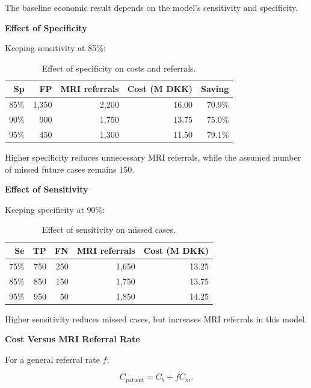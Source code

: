 \documentclass[11pt,a4paper]{article}
\newcommand{\subheading}[1]{%
    \vspace{3mm}
    {\large\bfseries\color{DTUblue}#1}\par
}
\begin{document}
The baseline economic result depends on
the model's sensitivity and specificity.

\subheading{Effect of Specificity}

Keeping sensitivity at 85\%:

\begin{table}[H]
\centering
\caption{Effect of specificity on costs and referrals.}
\begin{tabular}{@{}rrrrr@{}}
\toprule
\textbf{Sp} &
\textbf{FP} &
\textbf{MRI referrals} &
\textbf{Cost (M DKK)} &
\textbf{Saving} \\
\midrule
85\% & 1,350 & 2,200 & 16.00 & 70.9\% \\
90\% & 900 & 1,750 & 13.75 & 75.0\% \\
95\% & 450 & 1,300 & 11.50 & 79.1\% \\
\bottomrule
\end{tabular}
\end{table}

Higher specificity reduces unnecessary
MRI referrals, while the assumed number
of missed future cases remains 150.

\subheading{Effect of Sensitivity}

Keeping specificity at 90\%:

\begin{table}[H]
\centering
\caption{Effect of sensitivity on missed cases.}
\begin{tabular}{@{}rrrrr@{}}
\toprule
\textbf{Se} &
\textbf{TP} &
\textbf{FN} &
\textbf{MRI referrals} &
\textbf{Cost (M DKK)} \\
\midrule
75\% & 750 & 250 & 1,650 & 13.25 \\
85\% & 850 & 150 & 1,750 & 13.75 \\
95\% & 950 & 50 & 1,850 & 14.25 \\
\bottomrule
\end{tabular}
\end{table}

Higher sensitivity reduces missed cases,
but increases MRI referrals in this model.

\subheading{Cost Versus MRI Referral Rate}

For a general referral rate $f$:

\[
C_{\mathrm{patient}}=C_b+fC_m.
\]
\end{document}
